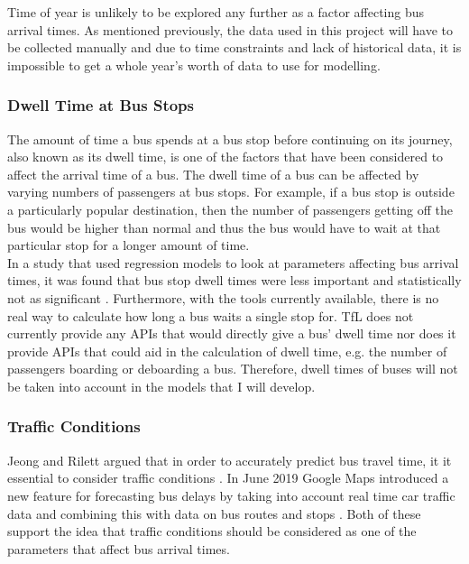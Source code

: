 Time of year is unlikely to be explored any further as a factor affecting bus arrival times. As mentioned previously, the data used in this project will have to be collected manually and due to time constraints and lack of historical data, it is impossible to get a whole year's worth of data to use for modelling. 

\subsubsection{Dwell Time at Bus Stops}
The amount of time a bus spends at a bus stop before continuing on its journey, also known as its dwell time, is one of the factors that have been considered to affect the arrival time of a bus. The dwell time of a bus can be affected by varying numbers of passengers at bus stops. For example, if a bus stop is outside a particularly popular destination, then the number of passengers getting off the bus would be higher than normal and thus the bus would have to wait at that particular stop for a longer amount of time. \\

In a study that used regression models to look at parameters affecting bus arrival times, it was found that bus stop dwell times were less important and statistically not as significant \cite{dynamic-gps}. Furthermore, with the tools currently available, there is no real way to calculate how long a bus waits a single stop for. TfL does not currently provide any APIs that would directly give a bus' dwell time nor does it provide APIs that could aid in the calculation of dwell time, e.g. the number of passengers boarding or deboarding a bus. Therefore, dwell times of buses will not be taken into account in the models that I will develop. 

\subsubsection{Traffic Conditions}
Jeong and Rilett argued that in order to accurately predict bus travel time, it it essential to consider traffic conditions \cite{ann-prediction}. In June 2019 Google Maps introduced a new feature for forecasting bus delays by taking into account real time car traffic data and combining this with data on bus routes and stops \cite{google-machine-learning}. Both of these support the idea that traffic conditions should be considered as one of the parameters that affect bus arrival times. \\

